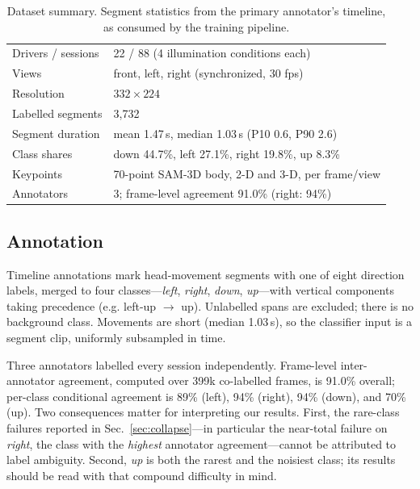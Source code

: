 \documentclass[journal]{IEEEtran}
\newcommand{\eg}{e.g.}
\begin{document}
\begin{table}[t]
\caption{Dataset summary.  Segment statistics from the primary annotator's
timeline, as consumed by the training pipeline.}
\label{tab:dataset}
\centering\footnotesize
\begin{tabular}{ll}
\toprule
Drivers / sessions & 22 / 88 (4 illumination conditions each) \\
Views              & front, left, right (synchronized, 30 fps) \\
Resolution         & $332\times224$ \\
Labelled segments  & 3{,}732 \\
Segment duration   & mean 1.47\,s, median 1.03\,s (P10 0.6, P90 2.6) \\
Class shares       & down 44.7\%, left 27.1\%, right 19.8\%, up 8.3\% \\
Keypoints          & 70-point SAM-3D body, 2-D and 3-D, per frame/view \\
Annotators         & 3; frame-level agreement 91.0\% (right: 94\%) \\
\bottomrule
\end{tabular}
\end{table}

\subsection{Annotation}
Timeline annotations mark head-movement segments with one of eight direction
labels, merged to four classes---\emph{left}, \emph{right}, \emph{down},
\emph{up}---with vertical components taking precedence (\eg{} left-up
$\rightarrow$ up).  Unlabelled spans are excluded; there is no background
class.  Movements are short (median 1.03\,s), so the classifier input is a
segment clip, uniformly subsampled in time.

Three annotators labelled every session independently.  Frame-level
inter-annotator agreement, computed over 399k co-labelled frames, is 91.0\%
overall; per-class conditional agreement is 89\% (left), 94\% (right), 94\%
(down), and 70\% (up).  Two consequences matter for interpreting our
results.  First, the rare-class failures reported in
Sec.~\ref{sec:collapse}---in particular the near-total failure on
\emph{right}, the class with the \emph{highest} annotator agreement---cannot
be attributed to label ambiguity.  Second, \emph{up} is both the rarest and
the noisiest class; its results should be read with that compound difficulty
in mind.
\end{document}
